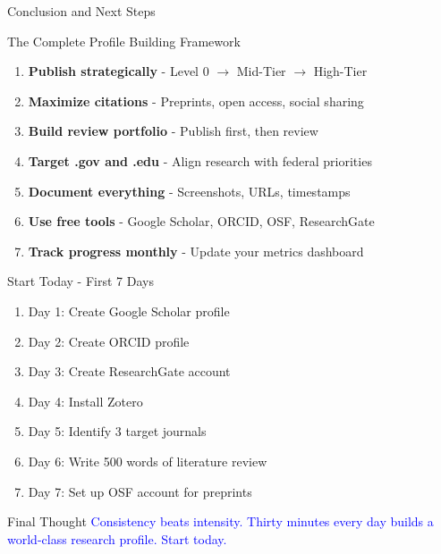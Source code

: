 \documentclass[11pt]{beamer}
\begin{document}
				\begin{frame}{Conclusion and Next Steps}
					\scriptsize
					\begin{block}{The Complete Profile Building Framework}
						\begin{enumerate}
							\item \textbf{Publish strategically} - Level 0 $\rightarrow$ Mid-Tier $\rightarrow$ High-Tier
							\item \textbf{Maximize citations} - Preprints, open access, social sharing
							\item \textbf{Build review portfolio} - Publish first, then review
							\item \textbf{Target .gov and .edu} - Align research with federal priorities
							\item \textbf{Document everything} - Screenshots, URLs, timestamps
							\item \textbf{Use free tools} - Google Scholar, ORCID, OSF, ResearchGate
							\item \textbf{Track progress monthly} - Update your metrics dashboard
						\end{enumerate}
					\end{block}
					\begin{block}{Start Today - First 7 Days}
						\begin{enumerate}
							\item Day 1: Create Google Scholar profile
							\item Day 2: Create ORCID profile
							\item Day 3: Create ResearchGate account
							\item Day 4: Install Zotero
							\item Day 5: Identify 3 target journals
							\item Day 6: Write 500 words of literature review
							\item Day 7: Set up OSF account for preprints
						\end{enumerate}
					\end{block}
					\begin{block}{Final Thought}
						\textcolor{blue}{Consistency beats intensity. Thirty minutes every day builds a world-class research profile. Start today.}
					\end{block}
				\end{frame}
				
			
\end{document}
